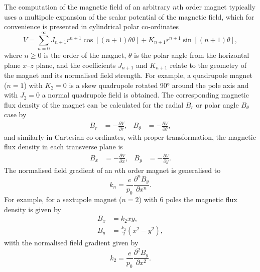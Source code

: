 \documentclass[../main.tex]{subfiles}
\begin{document}
The computation of the magnetic field of an arbitrary $n$th order magnet typically uses a multipole expansion of the scalar potential of the magnetic field, which for convenience is presented in cylindrical polar co-ordinates \cite{shepherd2016magnet}
\begin{equation}
V = \sum_{n=0}^{\infty} J_{n+1}r^{n+1}\cos\left[\left(n+1\right)\theta\theta\right]+K_{n+1}r^{n+1}\sin\left[\left(n+1\right)\theta\right],
\label{eq:multipole_scalar_potential}    
\end{equation}
where $n \geq 0$ is the order of the magnet, $\theta$ is the polar angle from the horizontal plane  $x$--$z$ plane, and the coefficients $J_{n+1}$ and $K_{n+1}$ relate to the geometry of the magnet and its normalised field strength. For example, a quadrupole magnet ($n=1$) with $K_{2}=0$ is a skew quadrupole rotated 90\si{\degree} around the pole axis and with $J_{2}=0$ a normal quadrupole field  is obtained. The corresponding magnetic flux density of the magnet can be calculated for the radial $B_{r}$ or polar angle $B_{\theta}$ case by    
\begin{align}
B_{r} &= -\frac{\partial V}{\partial r}, & B_{\theta} &= -\frac{\partial V}{\partial \theta},
\label{eq:multipole_magnetic_field_cylindrical}    
\end{align}
and similarly in Cartesian co-ordinates, with proper transformation, the magnetic flux density in each transverse plane is
\begin{align}
B_{x} &= -\frac{\partial V}{\partial x}, & B_{y} &= -\frac{\partial V}{\partial y}.
\label{eq:multipole_magnetic_field_cartesian}
\end{align}
The normalised field gradient of an $n$th order magnet is generalised to
\begin{equation}
k_{n} = \frac{e}{p_{0}}\frac{\partial^{n} B_{y}}{\partial x^{n}}.
\label{eq:multipole_normalised_field_gradient}    
\end{equation}
For example, for a sextupole magnet ($n=2$) with 6 poles the magnetic flux density is given by
\begin{align}
B_{x} &= k_{2}xy, \nonumber \\
B_{y} &= \frac{k_{2}}{2}\left(x^{2}-y^{2}\right),
\label{eq:sextupole_magnetic_field}    
\end{align}
wiith the normalised field gradient given by 
\begin{equation}
k_{2} = \frac{e}{p_{0}}\frac{\partial^{2}B_{y}}{\partial x^{2}}.
\label{eq:sextupole_field_gradient}    
\end{equation}
\end{document}
